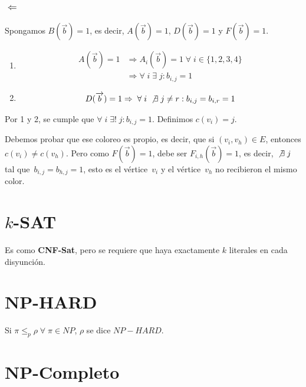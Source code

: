 \documentclass[10pt,a4paper]{article}
\begin{document}
\subsubsection*{$\Leftarrow$}

Spongamos $B(\overrightarrow{b}) = 1$, es decir, $A(\overrightarrow{b}) = 1$, $D(\overrightarrow{b}) = 1$ y $F(\overrightarrow{b}) = 1$.

\begin{enumerate}

	\item \begin{align*} A(\overrightarrow{b}) = 1 &\Rightarrow A_i(\overrightarrow{b}) = 1 \;\forall\; i \in \{1, 2, 3, 4\}\\ &\Rightarrow\forall\;i \;\exists\;j:b_{i,j} = 1 \end{align*}
	\item \begin{align*} D(\overrightarrow{b}) = 1 &\Rightarrow \;\forall \; i \; \not \exists\;j \neq r:b_{i,j}=b_{i,r}=1\\ \end{align*}
\end{enumerate}

Por 1 y 2, se cumple que $\forall\; i \;\exists !\; j:b_{i,j}=1$. Definimos $c(v_i) = j$.

Debemos probar que ese coloreo es propio, es decir, que si $(v_i, v_h) \in E$, entonces $c(v_i) \neq c(v_h)$. Pero como $F(\overrightarrow{b}) = 1$, debe ser $F_{i,h}(\overrightarrow{b}) = 1$, es decir, $\not \exists \; j$ tal que $b_{i,j} = b_{h,j} = 1$, esto es el vértice $v_i$ y el vértice $v_h$ no recibieron el mismo color.

\section*{$k$-SAT}

Es como \textbf{CNF-Sat}, pero se requiere que haya exactamente $k$ literales en cada disyunción.

\section*{NP-HARD}

Si $\pi \leq_p \rho \;\forall \;\pi \in NP$, $\rho$ se dice $NP-HARD$.

\section*{NP-Completo}
\end{document}
